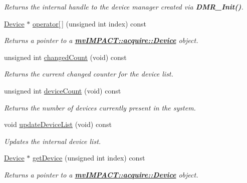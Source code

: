 \begin{DoxyCompactItemize}
\begin{DoxyCompactList}\small\item\em Returns the internal handle to the device manager created via {\bfseries D\+M\+R\+\_\+\+Init()}. \end{DoxyCompactList}\item 
\hyperlink{classmv_i_m_p_a_c_t_1_1acquire_1_1_device}{Device} $\ast$ \hyperlink{classmv_i_m_p_a_c_t_1_1acquire_1_1_device_manager_a37f937858e3fca7bdebd62856ddf4ea0}{operator\mbox{[}$\,$\mbox{]}} (unsigned int index) const 
\begin{DoxyCompactList}\small\item\em Returns a pointer to a {\bfseries \hyperlink{classmv_i_m_p_a_c_t_1_1acquire_1_1_device}{mv\+I\+M\+P\+A\+C\+T\+::acquire\+::\+Device}} object. \end{DoxyCompactList}\item 
unsigned int \hyperlink{classmv_i_m_p_a_c_t_1_1acquire_1_1_device_manager_acfff7b0dbb399008640b47de950b2b38}{changed\+Count} (void) const 
\begin{DoxyCompactList}\small\item\em Returns the current changed counter for the device list. \end{DoxyCompactList}\item 
unsigned int \hyperlink{classmv_i_m_p_a_c_t_1_1acquire_1_1_device_manager_a1d58b307ac5a3648cb6a0e8d5d3b37ab}{device\+Count} (void) const 
\begin{DoxyCompactList}\small\item\em Returns the number of devices currently present in the system. \end{DoxyCompactList}\item 
void \hyperlink{classmv_i_m_p_a_c_t_1_1acquire_1_1_device_manager_a2078f9532f67854352c3be3e32364879}{update\+Device\+List} (void) const 
\begin{DoxyCompactList}\small\item\em Updates the internal device list. \end{DoxyCompactList}\item 
\hyperlink{classmv_i_m_p_a_c_t_1_1acquire_1_1_device}{Device} $\ast$ \hyperlink{classmv_i_m_p_a_c_t_1_1acquire_1_1_device_manager_aebf05bf5500e7db13096c20611c15335}{get\+Device} (unsigned int index) const 
\begin{DoxyCompactList}\small\item\em Returns a pointer to a {\bfseries \hyperlink{classmv_i_m_p_a_c_t_1_1acquire_1_1_device}{mv\+I\+M\+P\+A\+C\+T\+::acquire\+::\+Device}} object. \end{DoxyCompactList}\item 

\end{DoxyCompactItemize}
